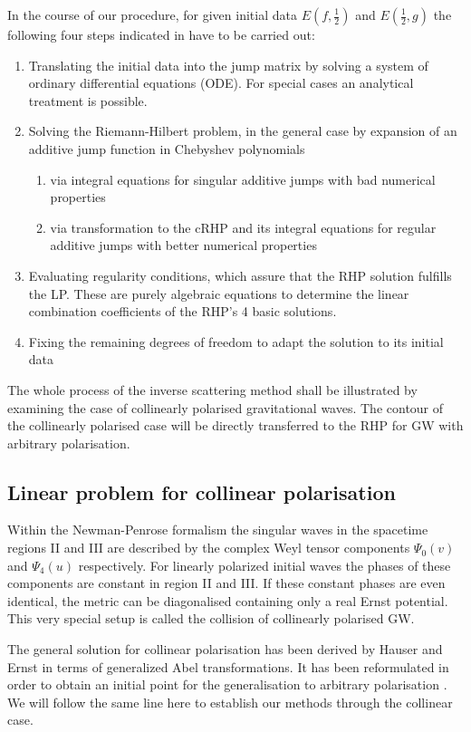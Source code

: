 \documentclass[12pt]{iopart}
\begin{document}
In the course of our procedure, for given initial data $E(f,\frac12)$ and $E(\frac12,g)$ the following four steps indicated in  have to be carried out: 
\begin{enumerate}
\item Translating the initial data into the jump matrix by solving a system of ordinary differential equations (ODE). For special cases an analytical treatment is possible.
\item Solving the Riemann-Hilbert problem, in the general case by expansion of an additive jump function in Chebyshev polynomials
\begin{enumerate}
\item via integral equations for singular additive jumps with bad numerical properties
\item via transformation to the cRHP and its integral equations for regular additive jumps with better numerical properties
\end{enumerate}
\item Evaluating regularity conditions, which assure that the RHP solution fulfills the LP. These are purely algebraic equations to determine the linear combination coefficients of the RHP's 4 basic solutions.
\item Fixing the remaining degrees of freedom to adapt the solution to its initial data
\end{enumerate}
The whole process of the inverse scattering method shall be illustrated by examining the case of collinearly polarised gravitational waves. The contour of the collinearly polarised case will be directly transferred to the RHP for GW with arbitrary polarisation.

\subsection{Linear problem for collinear polarisation}

Within the Newman-Penrose formalism the singular waves in the spacetime regions II and III are described by the complex Weyl tensor components $\Psi_0(v)$ and $\Psi_4(u)$ respectively. For linearly polarized initial waves the phases of these components are constant in region II and III. If these constant phases are even identical, the metric can be diagonalised containing only a real Ernst potential. This very special setup is called the collision of collinearly polarised GW.

The general solution for collinear polarisation has been derived by Hauser and Ernst \cite{Hauser_ErnstI1989} in terms of generalized Abel transformations. It has been reformulated in order to obtain an initial point for the generalisation to arbitrary polarisation \cite{Hauser_ErnstII1989}. We will follow the same line here to establish our methods through the collinear case.
\end{document}
